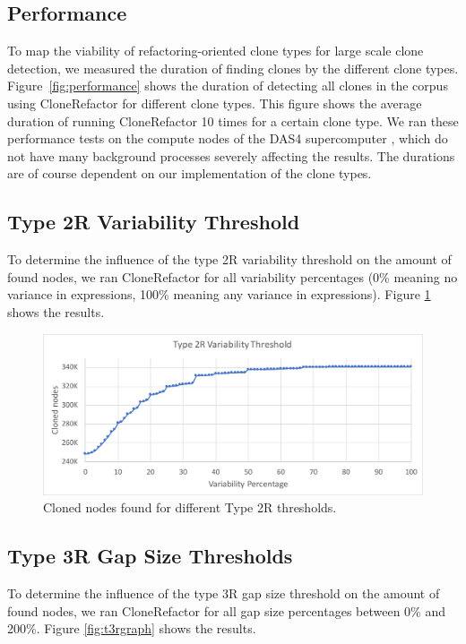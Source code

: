 \subsection{Performance}
To map the viability of refactoring-oriented clone types for large scale clone detection, we measured the duration of finding clones by the different clone types. Figure~\ref{fig:performance} shows the duration of detecting all clones in the corpus using CloneRefactor for different clone types. This figure shows the average duration of running CloneRefactor 10 times for a certain clone type. We ran these performance tests on the compute nodes of the DAS4 supercomputer \cite{bal2016medium}, which do not have many background processes severely affecting the results. The durations are of course dependent on our implementation of the clone types.

\subsection{Type 2R Variability Threshold}
To determine the influence of the type 2R variability threshold on the amount of found nodes, we ran CloneRefactor for all variability percentages (0\% meaning no variance in expressions, 100\% meaning any variance in expressions). Figure \ref{fig:t2rgraph} shows the results.

\begin{figure}[H]
  \includegraphics[width=1\textwidth]{img/T2R}
  \caption{Cloned nodes found for different Type 2R thresholds.}
  \label{fig:t2rgraph}
\end{figure}

\subsection{Type 3R Gap Size Thresholds}
To determine the influence of the type 3R gap size threshold on the amount of found nodes, we ran CloneRefactor for all gap size percentages between 0\% and 200\%. Figure \ref{fig:t3rgraph} shows the results.

